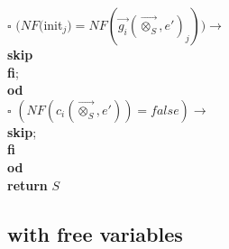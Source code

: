 \index{}\documentclass[a4paper,10pt]{article}
\theoremstyle{plain}
\theoremstyle{definition}
\newcommand{\ovr}{\overrightarrow}
\newcommand{\tb}{\textbf}
\newcommand{\sq}{$\square$}
\begin{document}
\begin{tabbing}
 \>	\>	\>  	\>    	\>        $\square$ \> $ (NF($init$_j) = NF(\ovr{g_i}(\ovr{\otimes_S}, e')_j)) \rightarrow$\\
  \>	\>	\> 	\>    	\>        \> \>  \tb{skip}\\	
  \>	\>	\> 	\> 	\>          \tb{fi}; \\
  \>	\>	\>	\> \tb{od}\\
  \>	\>	\sq 	\>  $(NF(c_i(\ovr{\otimes_S},e')) = false) \rightarrow$ \\
  \>	\>	\> 	\>\tb{skip};\\
  \>	\>	\tb{fi}\\
  \>	\tb{od} \\
 \tb{return} $S$
\end{tabbing} 


\newpage
\subsection{with free variables}
\end{document}

